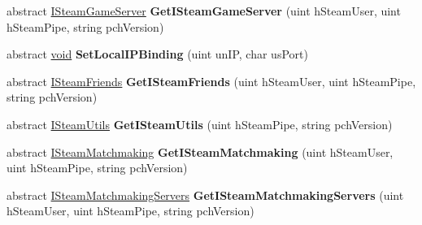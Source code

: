 \begin{DoxyCompactItemize}
\item 
\hypertarget{classValve_1_1Steamworks_1_1ISteamClient_ac00b1c3b645f5c0a03ebeba28ccd4262}{}abstract \hyperlink{classValve_1_1Steamworks_1_1ISteamGameServer}{I\+Steam\+Game\+Server} {\bfseries Get\+I\+Steam\+Game\+Server} (uint h\+Steam\+User, uint h\+Steam\+Pipe, string pch\+Version)\label{classValve_1_1Steamworks_1_1ISteamClient_ac00b1c3b645f5c0a03ebeba28ccd4262}

\item 
\hypertarget{classValve_1_1Steamworks_1_1ISteamClient_a5ccf65996877625852645d98caa74cb1}{}abstract \hyperlink{SDL__audio_8h_a52835ae37c4bb905b903cbaf5d04b05f}{void} {\bfseries Set\+Local\+I\+P\+Binding} (uint un\+I\+P, char us\+Port)\label{classValve_1_1Steamworks_1_1ISteamClient_a5ccf65996877625852645d98caa74cb1}

\item 
\hypertarget{classValve_1_1Steamworks_1_1ISteamClient_aca99b7e6173d04b4c1b0f8abda52f0ba}{}abstract \hyperlink{classValve_1_1Steamworks_1_1ISteamFriends}{I\+Steam\+Friends} {\bfseries Get\+I\+Steam\+Friends} (uint h\+Steam\+User, uint h\+Steam\+Pipe, string pch\+Version)\label{classValve_1_1Steamworks_1_1ISteamClient_aca99b7e6173d04b4c1b0f8abda52f0ba}

\item 
\hypertarget{classValve_1_1Steamworks_1_1ISteamClient_a8ddb5fe72c521bfcc08c5cb1e61bb83f}{}abstract \hyperlink{classValve_1_1Steamworks_1_1ISteamUtils}{I\+Steam\+Utils} {\bfseries Get\+I\+Steam\+Utils} (uint h\+Steam\+Pipe, string pch\+Version)\label{classValve_1_1Steamworks_1_1ISteamClient_a8ddb5fe72c521bfcc08c5cb1e61bb83f}

\item 
\hypertarget{classValve_1_1Steamworks_1_1ISteamClient_a4131ec4b66dcacf0cdb30059d794ec76}{}abstract \hyperlink{classValve_1_1Steamworks_1_1ISteamMatchmaking}{I\+Steam\+Matchmaking} {\bfseries Get\+I\+Steam\+Matchmaking} (uint h\+Steam\+User, uint h\+Steam\+Pipe, string pch\+Version)\label{classValve_1_1Steamworks_1_1ISteamClient_a4131ec4b66dcacf0cdb30059d794ec76}

\item 
\hypertarget{classValve_1_1Steamworks_1_1ISteamClient_aaa22ca34bb892e22712f7cebf6f3ecfe}{}abstract \hyperlink{classValve_1_1Steamworks_1_1ISteamMatchmakingServers}{I\+Steam\+Matchmaking\+Servers} {\bfseries Get\+I\+Steam\+Matchmaking\+Servers} (uint h\+Steam\+User, uint h\+Steam\+Pipe, string pch\+Version)\label{classValve_1_1Steamworks_1_1ISteamClient_aaa22ca34bb892e22712f7cebf6f3ecfe}


\end{DoxyCompactItemize}
